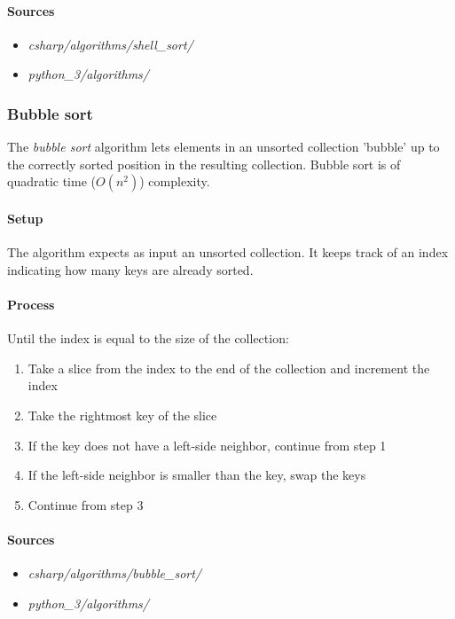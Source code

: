 \documentclass{article}
\begin{document}
\begin{samepage}
  \paragraph{Sources}
  \begin{itemize}
  \item{{\em csharp/algorithms/shell\_sort/}}
  \item{{\em python\_3/algorithms/}}
  \end{itemize}
\end{samepage}


\subsubsection{Bubble sort}
The {\em bubble sort} algorithm lets elements in an unsorted collection 'bubble' up to the correctly sorted position
in the resulting collection. Bubble sort is of quadratic time (\(O(n^2)\)) complexity.

\paragraph{Setup}
The algorithm expects as input an unsorted collection. It keeps track of an index indicating how many keys are
already sorted.

\paragraph{Process}
Until the index is equal to the size of the collection:
\begin{enumerate}
\item{Take a slice from the index to the end of the collection and increment the index}
\item{Take the rightmost key of the slice}
\item{If the key does not have a left-side neighbor, continue from step 1}
\item{If the left-side neighbor is smaller than the key, swap the keys}
\item{Continue from step 3}
\end{enumerate}

\begin{samepage}
  \paragraph{Sources}
  \begin{itemize}
  \item{{\em csharp/algorithms/bubble\_sort/}}
  \item{{\em python\_3/algorithms/}}
  \end{itemize}
\end{samepage}
\end{document}
